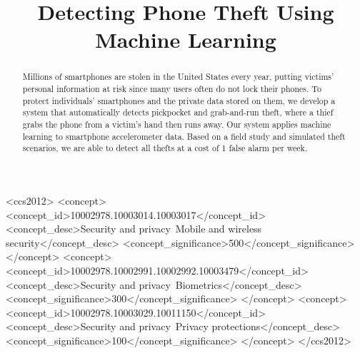 \documentclass[sigconf, anonymous]{acmart}
\begin{document}
\title{Detecting Phone Theft Using Machine Learning} %

\begin{abstract}
Millions of smartphones are stolen in the United States every year, putting victims' personal information at risk since many users often do not lock their phones. 
To protect individuals' smartphones and the private data stored on them, we develop a system that automatically detects pickpocket and grab-and-run theft, where a thief grabs the phone from a victim's hand then runs away. 
Our system applies machine learning to smartphone accelerometer data. Based on a field study and simulated theft scenarios, we are able to detect all thefts at a cost of 1 false alarm per week.
\end{abstract}

\begin{CCSXML}
<ccs2012>
<concept>
<concept_id>10002978.10003014.10003017</concept_id>
<concept_desc>Security and privacy~Mobile and wireless security</concept_desc>
<concept_significance>500</concept_significance>
</concept>
<concept>
<concept_id>10002978.10002991.10002992.10003479</concept_id>
<concept_desc>Security and privacy~Biometrics</concept_desc>
<concept_significance>300</concept_significance>
</concept>
<concept>
<concept_id>10002978.10003029.10011150</concept_id>
<concept_desc>Security and privacy~Privacy protections</concept_desc>
<concept_significance>100</concept_significance>
</concept>
</ccs2012>
\end{CCSXML}



\maketitle




\end{document}

